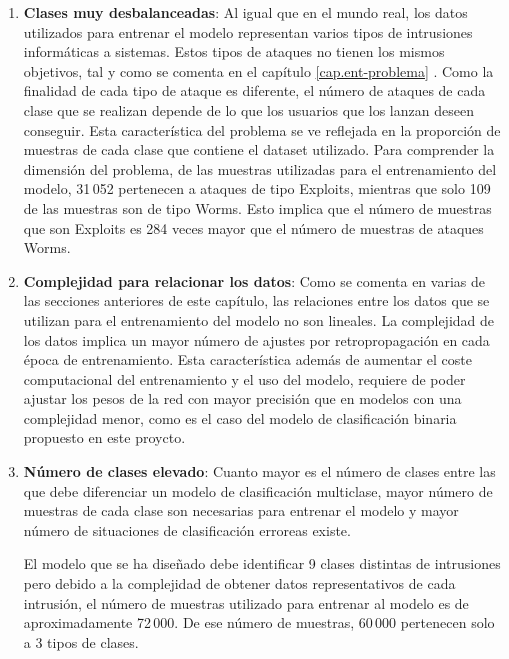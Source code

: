 \begin{enumerate}
	\item \textbf{Clases muy desbalanceadas}: Al igual que en el mundo real, los datos utilizados para entrenar el modelo representan varios tipos de intrusiones informáticas a sistemas. Estos tipos de ataques no tienen los mismos objetivos, tal y como se comenta en el capítulo \ref{cap.ent-problema} . Como la finalidad de cada tipo de ataque es diferente, el número de ataques de cada clase que se realizan depende de lo que los usuarios que los lanzan deseen conseguir. Esta característica del problema se ve reflejada en la proporción de muestras de cada clase que contiene el dataset utilizado. Para comprender la dimensión del problema, de las muestras utilizadas para el entrenamiento del modelo, 31\,052 pertenecen a ataques de tipo Exploits, mientras que solo 109 de las muestras son de tipo Worms. Esto implica que el número de muestras que son Exploits es 284 veces mayor que el número de muestras de ataques Worms.
	
	\item \textbf{Complejidad para relacionar los datos}: Como se comenta en varias de las secciones anteriores de este capítulo, las relaciones entre los datos que se utilizan para el entrenamiento del modelo no son lineales. La complejidad de los datos implica un mayor número de ajustes por retropropagación en cada época de entrenamiento. Esta característica además de aumentar el coste computacional del entrenamiento y el uso del modelo, requiere de poder ajustar los pesos de la red con mayor precisión que en modelos con una complejidad menor, como es el caso del modelo de clasificación binaria propuesto en este proycto.
	
	\item \textbf{Número de clases elevado}: Cuanto mayor es el número de clases entre las que debe diferenciar un modelo de clasificación multiclase, mayor número de muestras de cada clase son necesarias para entrenar el modelo y mayor número de situaciones de clasificación erroreas existe. 
	
	El modelo que se ha diseñado debe identificar 9 clases distintas de intrusiones pero debido a la complejidad de obtener datos representativos de cada intrusión, el número de muestras utilizado para entrenar al modelo es de aproximadamente 72\,000. De ese número de muestras, 60\,000 pertenecen solo a 3 tipos de clases.
	

\end{enumerate}
